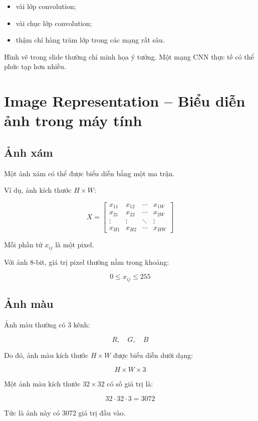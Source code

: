 \begin{itemize}
    \item vài lớp convolution;
    \item vài chục lớp convolution;
    \item thậm chí hàng trăm lớp trong các mạng rất sâu.
\end{itemize}

\begin{luuy}
Hình vẽ trong slide thường chỉ minh họa ý tưởng. Một mạng CNN thực tế có thể phức tạp hơn nhiều.
\end{luuy}

\section{Image Representation -- Biểu diễn ảnh trong máy tính}

\subsection{Ảnh xám}

Một ảnh xám có thể được biểu diễn bằng một ma trận.

Ví dụ, ảnh kích thước $H \times W$:

\[
    X =
    \begin{bmatrix}
    x_{11} & x_{12} & \cdots & x_{1W}\\
    x_{21} & x_{22} & \cdots & x_{2W}\\
    \vdots & \vdots & \ddots & \vdots\\
    x_{H1} & x_{H2} & \cdots & x_{HW}
    \end{bmatrix}
\]

Mỗi phần tử $x_{ij}$ là một pixel.

Với ảnh 8-bit, giá trị pixel thường nằm trong khoảng:

\[
    0 \leq x_{ij} \leq 255
\]

\subsection{Ảnh màu}

Ảnh màu thường có 3 kênh:

\[
    R,\quad G,\quad B
\]

Do đó, ảnh màu kích thước $H \times W$ được biểu diễn dưới dạng:

\[
    H \times W \times 3
\]

\begin{vidu}
Một ảnh màu kích thước $32 \times 32$ có số giá trị là:

\[
    32 \cdot 32 \cdot 3 = 3072
\]

Tức là ảnh này có 3072 giá trị đầu vào.
\end{vidu}

